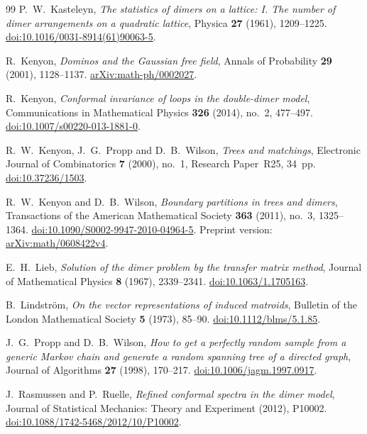 \begin{thebibliography}{99}
P.~W.~Kasteleyn,
\emph{The statistics of dimers on a lattice: I. The number of dimer
arrangements on a quadratic lattice},
Physica \textbf{27} (1961), 1209--1225.
\href{https://doi.org/10.1016/0031-8914(61)90063-5}{doi:10.1016/0031-8914(61)90063-5}.

R.~Kenyon,
\emph{Dominos and the Gaussian free field},
Annals of Probability \textbf{29} (2001), 1128--1137.
\href{https://arxiv.org/abs/math-ph/0002027}{arXiv:math-ph/0002027}.

R.~Kenyon,
\emph{Conformal invariance of loops in the double-dimer model},
Communications in Mathematical Physics \textbf{326} (2014), no.~2,
477--497.
\href{https://doi.org/10.1007/s00220-013-1881-0}{doi:10.1007/s00220-013-1881-0}.

R.~W.~Kenyon, J.~G.~Propp and D.~B.~Wilson,
\emph{Trees and matchings},
Electronic Journal of Combinatorics \textbf{7} (2000), no.~1,
Research Paper~R25, 34~pp.
\href{https://doi.org/10.37236/1503}{doi:10.37236/1503}.

R.~W.~Kenyon and D.~B.~Wilson,
\emph{Boundary partitions in trees and dimers},
Transactions of the American Mathematical Society \textbf{363} (2011),
no.~3, 1325--1364.
\href{https://doi.org/10.1090/S0002-9947-2010-04964-5}{doi:10.1090/S0002-9947-2010-04964-5}.
Preprint version:
\href{https://arxiv.org/abs/math/0608422v4}{arXiv:math/0608422v4}.

E.~H.~Lieb,
\emph{Solution of the dimer problem by the transfer matrix method},
Journal of Mathematical Physics \textbf{8} (1967), 2339--2341.
\href{https://doi.org/10.1063/1.1705163}{doi:10.1063/1.1705163}.

B.~Lindstr\"om,
\emph{On the vector representations of induced matroids},
Bulletin of the London Mathematical Society \textbf{5} (1973), 85--90.
\href{https://doi.org/10.1112/blms/5.1.85}{doi:10.1112/blms/5.1.85}.

J.~G.~Propp and D.~B.~Wilson,
\emph{How to get a perfectly random sample from a generic Markov chain
and generate a random spanning tree of a directed graph},
Journal of Algorithms \textbf{27} (1998), 170--217.
\href{https://doi.org/10.1006/jagm.1997.0917}{doi:10.1006/jagm.1997.0917}.

J.~Rasmussen and P.~Ruelle,
\emph{Refined conformal spectra in the dimer model},
Journal of Statistical Mechanics: Theory and Experiment (2012), P10002.
\href{https://doi.org/10.1088/1742-5468/2012/10/P10002}{doi:10.1088/1742-5468/2012/10/P10002}.


\end{thebibliography}
